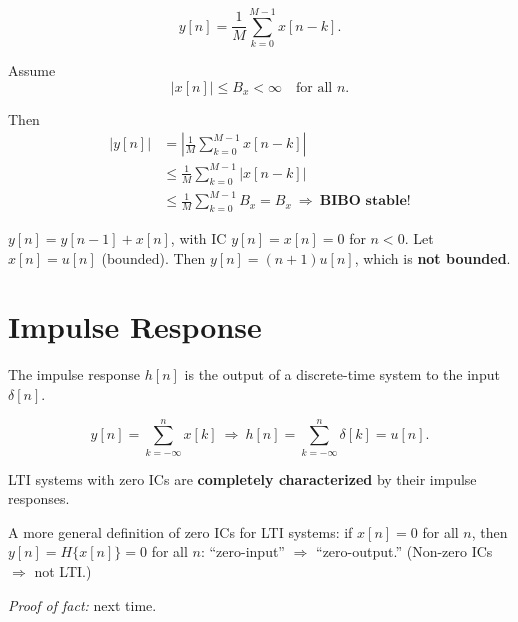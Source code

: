 \documentclass[handout_subfiles_root.tex]{subfiles}
\begin{document}
\begin{examplebox}[title={Example (Moving Average is BIBO Stable)}, handout mark=9]
\[
y[n] = \frac{1}{M}\sum_{k=0}^{M-1}x[n-k].
\]

Assume
\[
|x[n]| \le B_x < \infty \quad \text{for all } n.
\]

Then
\begin{align*}
|y[n]|
&= \left|\frac{1}{M}\sum_{k=0}^{M-1}x[n-k]\right| \\
&\le \frac{1}{M}\sum_{k=0}^{M-1}|x[n-k]| \\
&\le \frac{1}{M}\sum_{k=0}^{M-1}B_x = B_x
\ \Longrightarrow\ \textbf{BIBO stable!}
\end{align*}
\end{examplebox}

\begin{examplebox}[title={Example (Accumulator is \emph{Not} BIBO Stable)}]
$y[n] = y[n-1] + x[n]$, with IC $y[n]=x[n]=0$ for $n<0$. Let $x[n]=u[n]$
(bounded). Then $y[n] = (n+1)u[n]$, which is \textbf{not bounded}.
\end{examplebox}

\section{Impulse Response}\label{sec:impulse-response}

\begin{defbox}[title={Definition (Impulse Response)}]
The impulse response $h[n]$ is the output of a discrete-time system to the
input $\delta[n]$.
\end{defbox}

\begin{examplebox}[title={Example (Accumulator)}]
$$y[n] = \sum_{k=-\infty}^{n} x[k] \ \Longrightarrow\
  h[n] = \sum_{k=-\infty}^{n}\delta[k] = u[n].$$
\end{examplebox}

\begin{factbox}[title={Fact}, handout mark=10]\label{sec:convolution}
LTI systems with zero ICs are \textbf{completely characterized} by their
impulse responses.
\end{factbox}

\begin{notebox}
A more general definition of zero ICs for LTI systems: if $x[n]=0$ for all
$n$, then $y[n] = H\{x[n]\} = 0$ for all $n$: ``zero-input'' $\Rightarrow$
``zero-output.'' (Non-zero ICs $\Rightarrow$ not LTI.)

\emph{Proof of fact:} next time.
\end{notebox}
\end{document}
